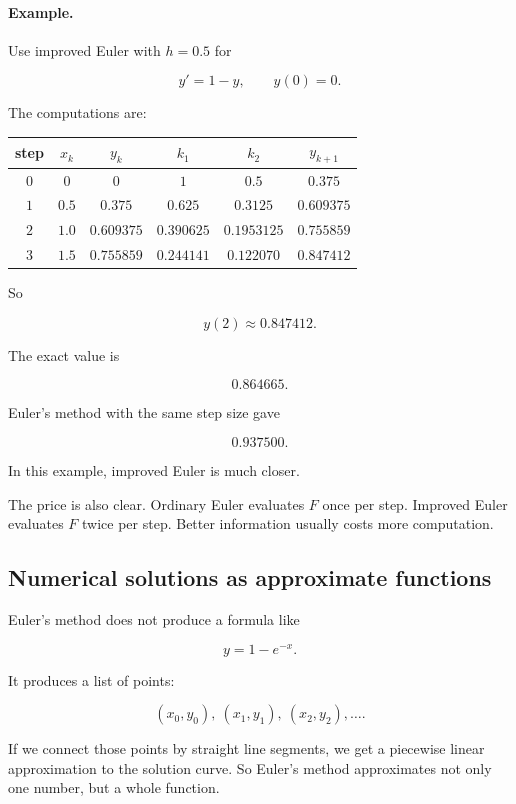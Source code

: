\paragraph{Example.}
Use improved Euler with \(h=0.5\) for

\[
y'=1-y,
\qquad
y(0)=0.
\]

The computations are:

\begin{center}
\begin{tabular}{c|c|c|c|c|c}
\textbf{step} & \(x_k\) & \(y_k\) & \(k_1\) & \(k_2\) & \(y_{k+1}\) \\ \hline
\(0\) & \(0\) & \(0\) & \(1\) & \(0.5\) & \(0.375\) \\
\(1\) & \(0.5\) & \(0.375\) & \(0.625\) & \(0.3125\) & \(0.609375\) \\
\(2\) & \(1.0\) & \(0.609375\) & \(0.390625\) & \(0.1953125\) & \(0.755859\) \\
\(3\) & \(1.5\) & \(0.755859\) & \(0.244141\) & \(0.122070\) & \(0.847412\)
\end{tabular}
\end{center}

So

\[
y(2)\approx0.847412.
\]

The exact value is

\[
0.864665.
\]

Euler's method with the same step size gave

\[
0.937500.
\]

In this example, improved Euler is much closer.

The price is also clear.  Ordinary Euler evaluates \(F\) once per step.  Improved Euler
evaluates \(F\) twice per step.  Better information usually costs more computation.

\subsection{Numerical solutions as approximate functions}
\label{subsec:numerical-solutions-approximate-functions}

Euler's method does not produce a formula like

\[
y=1-e^{-x}.
\]

It produces a list of points:

\[
(x_0,y_0),\ (x_1,y_1),\ (x_2,y_2),\ldots.
\]

If we connect those points by straight line segments, we get a piecewise linear
approximation to the solution curve.  So Euler's method approximates not only one
number, but a whole function.

